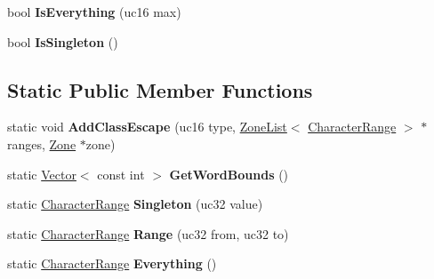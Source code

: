 \begin{DoxyCompactItemize}
\item 
bool {\bfseries Is\+Everything} (uc16 max)\hypertarget{classv8_1_1internal_1_1_character_range_ada7f7e22bf26b62a0dfa8d7c65f5469e}{}\label{classv8_1_1internal_1_1_character_range_ada7f7e22bf26b62a0dfa8d7c65f5469e}

\item 
bool {\bfseries Is\+Singleton} ()\hypertarget{classv8_1_1internal_1_1_character_range_aef36eef7241d9380d60df9a8bbaf71ec}{}\label{classv8_1_1internal_1_1_character_range_aef36eef7241d9380d60df9a8bbaf71ec}

\end{DoxyCompactItemize}
\subsection*{Static Public Member Functions}
\begin{DoxyCompactItemize}
\item 
static void {\bfseries Add\+Class\+Escape} (uc16 type, \hyperlink{classv8_1_1internal_1_1_zone_list}{Zone\+List}$<$ \hyperlink{classv8_1_1internal_1_1_character_range}{Character\+Range} $>$ $\ast$ranges, \hyperlink{classv8_1_1internal_1_1_zone}{Zone} $\ast$zone)\hypertarget{classv8_1_1internal_1_1_character_range_af235025c780c569dddf7d9213ea1751d}{}\label{classv8_1_1internal_1_1_character_range_af235025c780c569dddf7d9213ea1751d}

\item 
static \hyperlink{classv8_1_1internal_1_1_vector}{Vector}$<$ const int $>$ {\bfseries Get\+Word\+Bounds} ()\hypertarget{classv8_1_1internal_1_1_character_range_a6bfe19b63871347a50b077122d9dc8c2}{}\label{classv8_1_1internal_1_1_character_range_a6bfe19b63871347a50b077122d9dc8c2}

\item 
static \hyperlink{classv8_1_1internal_1_1_character_range}{Character\+Range} {\bfseries Singleton} (uc32 value)\hypertarget{classv8_1_1internal_1_1_character_range_a6c3ef8e750a0d1b8b4a1bf76fc423f1f}{}\label{classv8_1_1internal_1_1_character_range_a6c3ef8e750a0d1b8b4a1bf76fc423f1f}

\item 
static \hyperlink{classv8_1_1internal_1_1_character_range}{Character\+Range} {\bfseries Range} (uc32 from, uc32 to)\hypertarget{classv8_1_1internal_1_1_character_range_a32b358e230887d725cff947f04fcc928}{}\label{classv8_1_1internal_1_1_character_range_a32b358e230887d725cff947f04fcc928}

\item 
static \hyperlink{classv8_1_1internal_1_1_character_range}{Character\+Range} {\bfseries Everything} ()\hypertarget{classv8_1_1internal_1_1_character_range_ad9b69fc9e62b3eaae9d56d57ffe1ed08}{}\label{classv8_1_1internal_1_1_character_range_ad9b69fc9e62b3eaae9d56d57ffe1ed08}


\end{DoxyCompactItemize}
